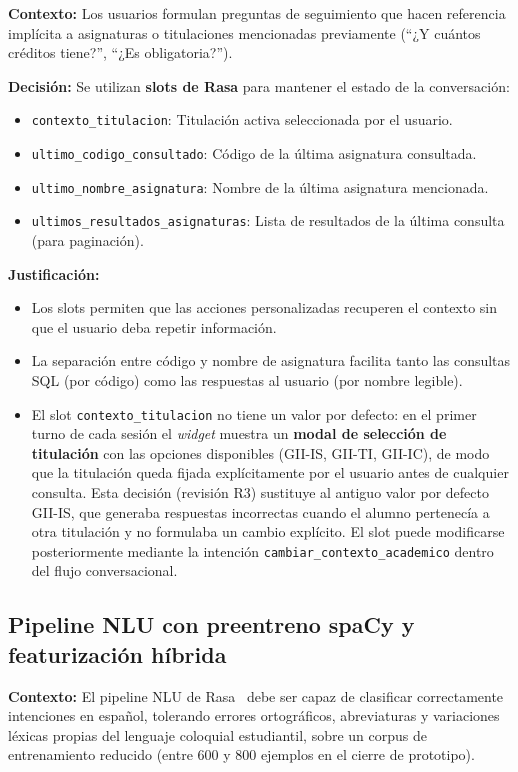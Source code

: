 \textbf{Contexto:} Los usuarios formulan preguntas de seguimiento que hacen referencia implícita a asignaturas o titulaciones mencionadas previamente (``¿Y cuántos créditos tiene?'', ``¿Es obligatoria?'').

\textbf{Decisión:} Se utilizan \textbf{slots de Rasa} para mantener el estado de la conversación:
\begin{itemize}
    \item \texttt{contexto\_titulacion}: Titulación activa seleccionada por el usuario.
    \item \texttt{ultimo\_codigo\_consultado}: Código de la última asignatura consultada.
    \item \texttt{ultimo\_nombre\_asignatura}: Nombre de la última asignatura mencionada.
    \item \texttt{ultimos\_resultados\_asignaturas}: Lista de resultados de la última consulta (para paginación).
\end{itemize}

\textbf{Justificación:}
\begin{itemize}
    \item Los slots permiten que las acciones personalizadas recuperen el contexto sin que el usuario deba repetir información.
    \item La separación entre código y nombre de asignatura facilita tanto las consultas SQL (por código) como las respuestas al usuario (por nombre legible).
    \item El slot \texttt{contexto\_titulacion} no tiene un valor por defecto: en el primer turno de cada sesión el \textit{widget} muestra un \textbf{modal de selección de titulación} con las opciones disponibles (GII-IS, GII-TI, GII-IC), de modo que la titulación queda fijada explícitamente por el usuario antes de cualquier consulta. Esta decisión (revisión R3) sustituye al antiguo valor por defecto GII-IS, que generaba respuestas incorrectas cuando el alumno pertenecía a otra titulación y no formulaba un cambio explícito. El slot puede modificarse posteriormente mediante la intención \texttt{cambiar\_contexto\_academico} dentro del flujo conversacional.
\end{itemize}

\subsection{Pipeline NLU con preentreno spaCy y featurización híbrida}\label{subsec:dd-pipeline}

\textbf{Contexto:} El pipeline NLU de Rasa~\cite{rasadocs,bocklisch2017rasa} debe ser capaz de clasificar correctamente intenciones en español, tolerando errores ortográficos, abreviaturas y variaciones léxicas propias del lenguaje coloquial estudiantil, sobre un corpus de entrenamiento reducido (entre 600 y 800 ejemplos en el cierre de prototipo).

